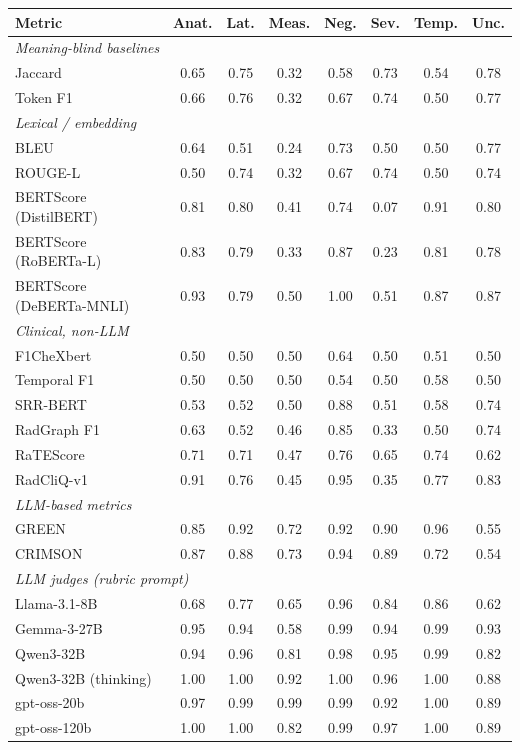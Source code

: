 \begin{tabular}{lccccccc}
\toprule
\textbf{Metric} & Anat. & Lat. & Meas. & Neg. & Sev. & Temp. & Unc. \\
\midrule
\multicolumn{8}{l}{\textit{Meaning-blind baselines}} \\
Jaccard & 0.65 & 0.75 & 0.32 & 0.58 & 0.73 & 0.54 & 0.78 \\
Token F1 & 0.66 & 0.76 & 0.32 & 0.67 & 0.74 & 0.50 & 0.77 \\
\multicolumn{8}{l}{\textit{Lexical / embedding}} \\
BLEU & 0.64 & 0.51 & 0.24 & 0.73 & 0.50 & 0.50 & 0.77 \\
ROUGE-L & 0.50 & 0.74 & 0.32 & 0.67 & 0.74 & 0.50 & 0.74 \\
BERTScore (DistilBERT) & 0.81 & 0.80 & 0.41 & 0.74 & 0.07 & 0.91 & 0.80 \\
BERTScore (RoBERTa-L) & 0.83 & 0.79 & 0.33 & 0.87 & 0.23 & 0.81 & 0.78 \\
BERTScore (DeBERTa-MNLI) & 0.93 & 0.79 & 0.50 & 1.00 & 0.51 & 0.87 & 0.87 \\
\multicolumn{8}{l}{\textit{Clinical, non-LLM}} \\
F1CheXbert & 0.50 & 0.50 & 0.50 & 0.64 & 0.50 & 0.51 & 0.50 \\
Temporal F1 & 0.50 & 0.50 & 0.50 & 0.54 & 0.50 & 0.58 & 0.50 \\
SRR-BERT & 0.53 & 0.52 & 0.50 & 0.88 & 0.51 & 0.58 & 0.74 \\
RadGraph F1 & 0.63 & 0.52 & 0.46 & 0.85 & 0.33 & 0.50 & 0.74 \\
RaTEScore & 0.71 & 0.71 & 0.47 & 0.76 & 0.65 & 0.74 & 0.62 \\
RadCliQ-v1 & 0.91 & 0.76 & 0.45 & 0.95 & 0.35 & 0.77 & 0.83 \\
\multicolumn{8}{l}{\textit{LLM-based metrics}} \\
GREEN & 0.85 & 0.92 & 0.72 & 0.92 & 0.90 & 0.96 & 0.55 \\
CRIMSON & 0.87 & 0.88 & 0.73 & 0.94 & 0.89 & 0.72 & 0.54 \\
\multicolumn{8}{l}{\textit{LLM judges (rubric prompt)}} \\
Llama-3.1-8B & 0.68 & 0.77 & 0.65 & 0.96 & 0.84 & 0.86 & 0.62 \\
Gemma-3-27B & 0.95 & 0.94 & 0.58 & 0.99 & 0.94 & 0.99 & 0.93 \\
Qwen3-32B & 0.94 & 0.96 & 0.81 & 0.98 & 0.95 & 0.99 & 0.82 \\
Qwen3-32B (thinking) & 1.00 & 1.00 & 0.92 & 1.00 & 0.96 & 1.00 & 0.88 \\
gpt-oss-20b & 0.97 & 0.99 & 0.99 & 0.99 & 0.92 & 1.00 & 0.89 \\
gpt-oss-120b & 1.00 & 1.00 & 0.82 & 0.99 & 0.97 & 1.00 & 0.89 \\
\bottomrule
\end{tabular}